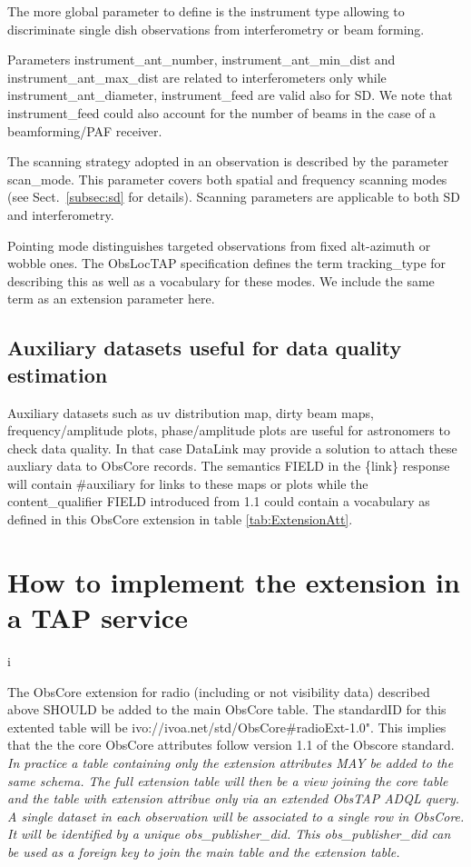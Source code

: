 \documentclass[11pt,a4paper]{ivoa}
\begin{document}
The more global parameter to define is the instrument type allowing to discriminate single dish observations from interferometry or beam forming.

Parameters instrument\_ant\_number, instrument\_ant\_min\_dist and instrument\_ant\_max\_dist are related to interferometers only while instrument\_ant\_diameter, instrument\_feed are valid also for SD.
We note that instrument\_feed could also  account for the number of beams in the case of a beamforming/PAF receiver.

The scanning strategy adopted in an observation is described by the parameter scan\_mode. This parameter covers both spatial and frequency scanning modes (see Sect.~\ref{subsec:sd} for details).
Scanning parameters are applicable to both SD and interferometry.

Pointing mode distinguishes targeted observations from  fixed alt-azimuth or wobble ones. The ObsLocTAP specification \citep{2021ivoa.spec.0724S} defines the term tracking\_type for describing this as well as a  vocabulary for these modes. We include the same term as an extension parameter here.


\subsection{Auxiliary datasets useful for data quality estimation}

Auxiliary datasets such as  uv distribution map, dirty beam maps, frequency/amplitude plots, phase/amplitude plots are useful for astronomers to check data quality.
In that case DataLink \citep{2015ivoa.spec.0617D} may provide a solution to attach these auxliary data to ObsCore records. The semantics FIELD in the \{link\} response  will contain \#auxiliary  for links to these maps or plots while  the content\_qualifier FIELD introduced from 1.1  could contain a vocabulary as defined in this ObsCore extension in table \ref{tab:ExtensionAtt}.


\section{How to implement the extension in a TAP service}i
\label{sec:implementation}

The ObsCore extension for radio (including or not visibility data) described above SHOULD  be added to the main ObsCore table. The standardID for this extented table will be ivo://ivoa.net/std/ObsCore\#radioExt-1.0". This implies that the the core ObsCore attributes follow version 1.1 of the Obscore standard.
\textit{ In practice a  table containing only the extension attributes  MAY be added to the same schema. The full extension table will then be a view joining the core table and the  table with extension attribue only via an extended ObsTAP ADQL query. A single dataset in each observation will be associated to a single row in ObsCore. It will be identified by a unique obs\_publisher\_did. This obs\_publisher\_did can be used as a foreign key to join the main table and the extension table.}
\end{document}
